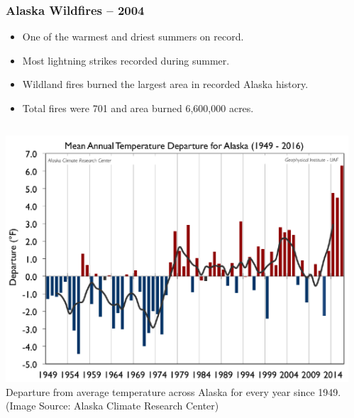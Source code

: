 \documentclass{beamer}
\begin{document}
\begin{frame}
  \frametitle{Alaska Wildfires -- 2004}
  \begin{itemize}

\item One of the warmest and driest summers on record.
\item Most lightning strikes recorded during summer. 
\item Wildland fires burned the largest area in recorded Alaska history.
\item Total fires were 701 and area burned 6,600,000 acres.
\end{itemize}

\begin{columns}[T]
    \begin{column}{.5\textwidth}
     
\includegraphics[width=1.0\textwidth]{figs/StateWide_Change_1949-2016_F.pdf}
  \\
  \tiny
  Departure from average temperature across Alaska for every year since 1949. 
(Image Source: Alaska Climate Research Center)
    \end{column}
    \begin{column}{.5\textwidth}
    

\end{column}
\end{columns}
\end{frame}
\end{document}
